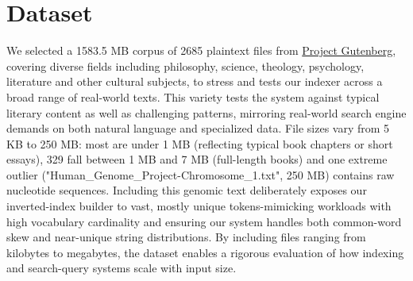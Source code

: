\section{Dataset}

\hypersetup{
	colorlinks=true,
	urlcolor=blue
}

We selected a 1583.5 MB corpus of 2685 plaintext files from \href{https://www.gutenberg.org/}{Project Gutenberg}, covering diverse fields including philosophy, science, theology, psychology, literature and other cultural subjects, to stress and tests our indexer across a broad range of real-world texts. This variety tests the system against typical literary content as well as challenging patterns, mirroring real-world search engine demands on both natural language and specialized data. File sizes vary from 5 KB to 250 MB: most are under 1 MB (reflecting typical book chapters or short essays), 329 fall between 1 MB and 7 MB (full-length books) and one extreme outlier ("Human\_Genome\_Project-Chromosome\_1.txt", 250 MB) contains raw nucleotide sequences. Including this genomic text deliberately exposes our inverted-index builder to vast, mostly unique tokens-mimicking workloads with high vocabulary cardinality and ensuring our system handles both common-word skew and near-unique string distributions. By including files ranging from kilobytes to megabytes, the dataset enables a rigorous evaluation of how indexing and search-query systems scale with input size. 



